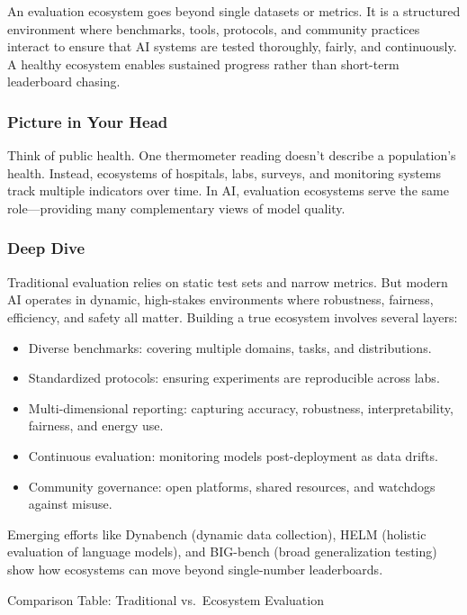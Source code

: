 \documentclass[
  letterpaper,
  DIV=11,
  numbers=noendperiod]{scrreprt}
\providecommand{\tightlist}{%
  \setlength{\itemsep}{0pt}\setlength{\parskip}{0pt}}
\begin{document}
An evaluation ecosystem goes beyond single datasets or metrics. It is a
structured environment where benchmarks, tools, protocols, and community
practices interact to ensure that AI systems are tested thoroughly,
fairly, and continuously. A healthy ecosystem enables sustained progress
rather than short-term leaderboard chasing.

\subsubsection{Picture in Your Head}\label{picture-in-your-head-89}

Think of public health. One thermometer reading doesn't describe a
population's health. Instead, ecosystems of hospitals, labs, surveys,
and monitoring systems track multiple indicators over time. In AI,
evaluation ecosystems serve the same role---providing many complementary
views of model quality.

\subsubsection{Deep Dive}\label{deep-dive-89}

Traditional evaluation relies on static test sets and narrow metrics.
But modern AI operates in dynamic, high-stakes environments where
robustness, fairness, efficiency, and safety all matter. Building a true
ecosystem involves several layers:

\begin{itemize}
\tightlist
\item
  Diverse benchmarks: covering multiple domains, tasks, and
  distributions.
\item
  Standardized protocols: ensuring experiments are reproducible across
  labs.
\item
  Multi-dimensional reporting: capturing accuracy, robustness,
  interpretability, fairness, and energy use.
\item
  Continuous evaluation: monitoring models post-deployment as data
  drifts.
\item
  Community governance: open platforms, shared resources, and watchdogs
  against misuse.
\end{itemize}

Emerging efforts like Dynabench (dynamic data collection), HELM
(holistic evaluation of language models), and BIG-bench (broad
generalization testing) show how ecosystems can move beyond
single-number leaderboards.

Comparison Table: Traditional vs.~Ecosystem Evaluation
\end{document}
